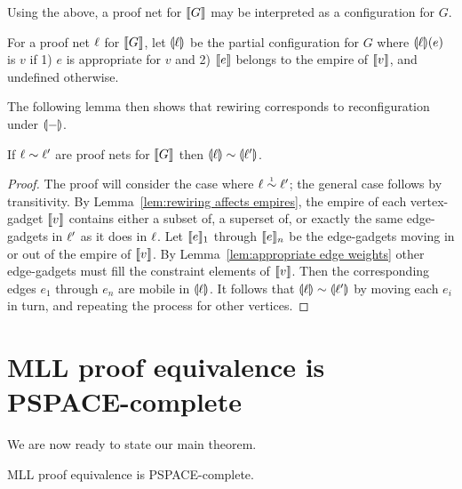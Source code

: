 \documentclass{sigplanconf-modified}
\let\beforesection=\medskip
\let\aftersection=\noindent
\let\capsabbrev=\uppercase
\begin{document}
Using the above, a proof net for $\llbracket G\rrbracket$ may be interpreted as a configuration for $G$.



\begin{definition}
For a proof net $\ell$ for $\llbracket G\rrbracket$, let $\llparenthesis\ell\rrparenthesis$ be the partial configuration for $G$ where $\llparenthesis\ell\rrparenthesis(e)$ is $v$ if 1) $e$ is appropriate for $v$ and 2) $\llbracket e\rrbracket$ belongs to the empire of $\llbracket v\rrbracket$, and undefined otherwise.
\end{definition}


The following lemma then shows that rewiring corresponds to reconfiguration under $\llparenthesis-\rrparenthesis$.



\begin{lemma}
\label{lem:soundness}
If $\links\perm\links'$ are proof nets for $\llbracket G\rrbracket$ then $\coitn\links\perm\coitn{\links'}$.
\end{lemma}

\begin{proof}
The proof will consider the case where $\links\perm*\links'$; the general case follows by transitivity.
%
By Lemma~\ref{lem:rewiring affects empires}, the empire of each vertex-gadget $\llbracket v\rrbracket$ contains either a subset of, a superset of, or exactly the same edge-gadgets in $\ell'$ as it does in $\ell$.
%
Let $\llbracket e\rrbracket_1$ through $\llbracket e\rrbracket_n$ be the edge-gadgets moving in or out of the empire of $\llbracket v\rrbracket$.
%
By Lemma~\ref{lem:appropriate edge weights} other edge-gadgets must fill the constraint elements of $\llbracket v\rrbracket$.
%
Then the corresponding edges $e_1$ through $e_n$ are mobile in $\llparenthesis\ell\rrparenthesis$.
%
It follows that $\coitn\links\perm\coitn{\links'}$ by moving each $e_i$ in turn, and repeating the process for other vertices.
%
\end{proof}



\beforesection

\section{\capsabbrev{mll} proof equivalence is \capsabbrev{pspace}-complete}

\aftersection
%
We are now ready to state our main theorem.


\begin{theorem}
\capsabbrev{mll} proof equivalence is \capsabbrev{pspace}-complete.
\end{theorem}
\end{document}
